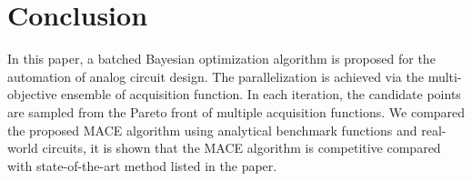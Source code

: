 \section{Conclusion}

In this paper, a batched Bayesian optimization algorithm is proposed for the
automation of analog circuit design. The parallelization is achieved via
the multi-objective ensemble of acquisition function. In each iteration, the
candidate points are sampled from the Pareto front of multiple acquisition
functions. We compared the proposed MACE algorithm using analytical benchmark
functions and real-world circuits, it is shown that the MACE algorithm is
competitive compared with state-of-the-art method listed in the paper.
